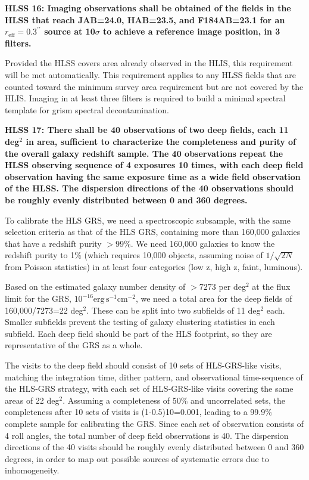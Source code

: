  \noindent
 {\bf HLSS 16: Imaging observations shall be obtained of the fields in the HLSS that
 reach JAB=24.0, HAB=23.5, and F184AB=23.1 for an $r_\mathrm{eff}=0.3^{\prime\prime}$
 source at 10$\sigma$ to achieve a reference image position, in 3 filters.}

 Provided the HLSS covers area already observed in the HLIS, this
 requirement will be met automatically.  This requirement applies to any HLSS
 fields that are counted toward the minimum survey area requirement but are not
 covered by the HLIS.  Imaging in at least three filters is required to build a
 minimal spectral template for grism spectral decontamination.

 \noindent
 {\bf HLSS 17: There shall be 40 observations of two deep fields, each 11 deg$^2$ in area,
 sufficient to characterize the completeness and purity of the overall galaxy redshift sample. The
 40 observations repeat the HLSS observing sequence of 4 exposures 10 times, with each deep
 field observation having the same exposure time as a wide field observation of the HLSS.
 The dispersion directions of the 40 observations should be roughly evenly distributed between 0 and 360 degrees.}

 To calibrate the HLS GRS, we need a spectroscopic subsample, with the same
 selection criteria as that of the HLS GRS, containing more than 160,000 galaxies
 that have a redshift purity $>99\%$.
 We need 160,000 galaxies to know the redshift purity to 1\% (which requires
 10,000 objects, assuming noise of $1/\sqrt{2N}$ from Poisson statistics) in at least
 four categories (low z, high z, faint, luminous).

 Based on the estimated galaxy number density of $>7273$ per deg$^2$ at the flux limit
 for the GRS, $10^{-16} \mathrm{erg} \, \mathrm{s}^{-1}\mathrm{cm}^{-2}$, we need a
 total area for the deep fields of 160,000/7273=22 deg$^2$.  These can be split
 into two subfields of 11 deg$^2$ each.  Smaller subfields prevent the testing of
 galaxy clustering statistics in each subfield. Each deep field should be part of
 the HLS footprint, so they are representative of the GRS as a whole.

 The visits to the deep field should consist of 10 sets of HLS-GRS-like visits,
 matching the integration time, dither pattern, and observational time-sequence
 of the HLS-GRS strategy, with each set of HLS-GRS-like visits covering the same
 areas of 22 deg$^2$. Assuming a completeness of 50\% and uncorrelated sets, the
 completeness after 10 sets of visits is (1-0.5)10=0.001, leading to a 99.9\%
 complete sample for calibrating the GRS. Since each set of observation consists
 of 4 roll angles, the total number of deep field observations is 40. The
 dispersion directions of the 40 visits should be roughly evenly distributed
 between 0 and 360 degrees, in order to map out possible sources of systematic
 errors due to inhomogeneity.

